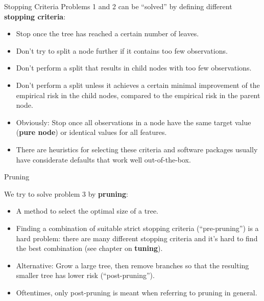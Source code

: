 \documentclass[11pt,compress,t,notes=noshow, xcolor=table]{beamer}
\begin{document}
\begin{vbframe}{Stopping Criteria}
Problems 1 and 2 can be \enquote{solved} by defining different \textbf{stopping criteria}:
  \begin{itemize}
    \item Stop once the tree has reached a certain number of leaves.
    \item Don't try to split a node further if it contains too few observations.
    \item Don't perform a split that results in child nodes with too few observations.
    \item Don't perform a split unless it achieves a certain minimal improvement of the empirical risk in the child nodes, compared to the empirical risk in the parent node.
    \item Obviously: Stop once all observations in a node have the same target value (\textbf{pure node}) or identical values for all features. 
    \item There are heuristics for selecting these criteria and software packages usually have considerate defaults that work well out-of-the-box.
  \end{itemize}
\end{vbframe}

\begin{vbframe}{Pruning}

We try to solve problem 3 by \textbf{pruning}:

\begin{itemize}
\item A method to select the optimal size of a tree.
\item Finding a combination of suitable strict stopping criteria (\enquote{pre-pruning}) is a hard problem: there are many different stopping criteria and it's hard to find the best combination (see chapter on \textbf{tuning}).
\item Alternative: Grow a large tree, then remove branches so that the resulting smaller tree has lower risk (\enquote{post-pruning}).
\item Oftentimes, only post-pruning is meant when referring to pruning in general.

\end{itemize}
\end{vbframe}
\end{document}
